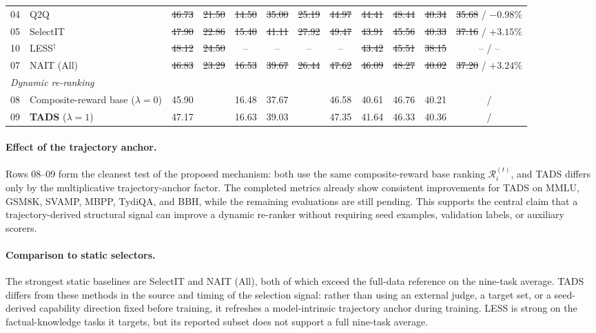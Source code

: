 \begin{table}[t]
\begin{tabular}{llcccccccccc}
04 & Q2Q
& \sout{46.73} & \sout{21.50} & \sout{14.50} & \sout{35.00}
& \sout{25.19} & \sout{44.97} & \sout{44.41} & \sout{48.44}
& \sout{40.34} & \sout{35.68} / \sout{$-0.98\%$} \\

05 & SelectIT
& \sout{47.90} & \sout{22.86} & \sout{15.40} & \sout{41.11}
& \sout{27.92} & \sout{49.47} & \sout{43.91} & \sout{45.56}
& \sout{40.33} & \sout{37.16} / \sout{$+3.15\%$} \\

10 & LESS$^{\dagger}$
& \sout{48.12} & \sout{24.50} & -- & --
& -- & -- & \sout{43.42} & \sout{45.51}
& \sout{38.15} & -- / -- \\

07 & NAIT (All)
& \sout{46.83} & \sout{23.29} & \sout{16.53} & \sout{39.67}
& \sout{26.44} & \sout{47.62} & \sout{46.09} & \sout{48.27}
& \sout{40.02} & \sout{37.20} / \sout{$+3.24\%$} \\

\midrule
\midrule
\multicolumn{12}{l}{\textit{Dynamic re-ranking}}\\
08 & Composite-reward base ($\lambda=0$)
& 45.90 & \STATUS{??.??} & 16.48 & 37.67
& \STATUS{??.??} & 46.58 & 40.61 & 46.76
& 40.21 & \STATUS{??.??} / \STATUS{?} \\

09 & \textbf{TADS} ($\lambda=1$)
& 47.17 & \STATUS{??.??} & 16.63 & 39.03
& \STATUS{??.??} & 47.35 & 41.64 & 46.33
& 40.36 & \STATUS{??.??} / \STATUS{?} \\

\bottomrule
\end{tabular}
\end{table}

\paragraph{Effect of the trajectory anchor.}
Rows 08--09 form the cleanest test of the proposed mechanism: both
use the same composite-reward base ranking
$\mathcal{R}_i^{(t)}$, and \textsc{TADS} differs only by
the multiplicative trajectory-anchor factor. The completed metrics
already show consistent improvements for \textsc{TADS} on MMLU,
GSM8K, SVAMP, MBPP, TydiQA, and BBH, while the remaining
evaluations are still pending. This supports the central claim
that a trajectory-derived structural signal can improve a dynamic
re-ranker without requiring seed examples, validation labels, or
auxiliary scorers.

\paragraph{Comparison to static selectors.}
The strongest static baselines are SelectIT and NAIT (All), both
of which exceed the full-data reference on the nine-task average.
\textsc{TADS} differs from these methods in the source and timing
of the selection signal: rather than using an external judge, a
target set, or a seed-derived capability direction fixed before
training, it refreshes a model-intrinsic trajectory anchor during
training. LESS is strong on the factual-knowledge tasks it
targets, but its reported subset does not support a full nine-task
average.

